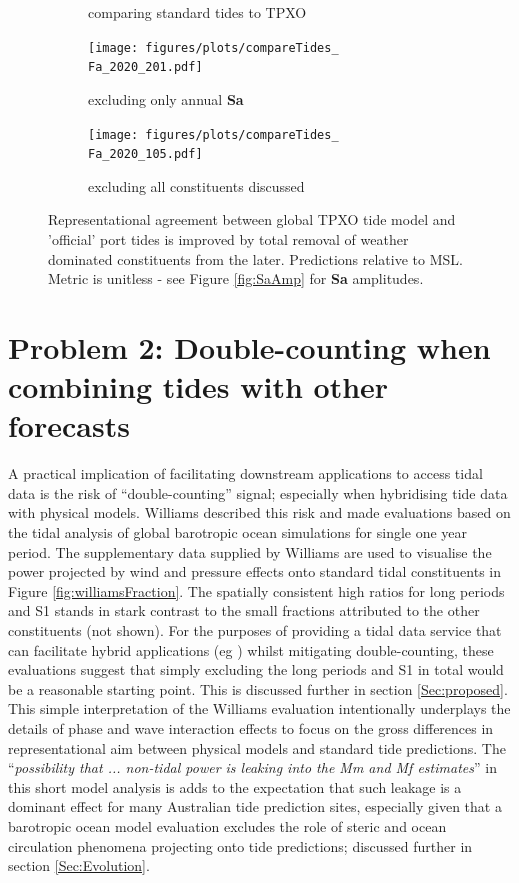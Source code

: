 \begin{figure}[H]
\begin{subfigure}[b]{\figwidthThird}
        \caption{\Fname{} comparing standard tides to TPXO}
    \end{subfigure}
    \begin{subfigure}[b]{\figwidthThird}
        \texttt{[image: figures/plots/compareTides\_\\Fa\_2020\_201.pdf]} 
        \caption{\Fname{} excluding only annual \textbf{Sa}}
    \end{subfigure}
    \begin{subfigure}[b]{\figwidthThird}
        \texttt{[image: figures/plots/compareTides\_\\Fa\_2020\_105.pdf]} 
        \caption{\Fname{} excluding all constituents discussed}
    \end{subfigure}
    
    \caption{Representational agreement between global TPXO tide model and 'official' port tides is improved by total removal of weather dominated constituents from the later.   Predictions relative to MSL.  Metric is unitless - see Figure \ref{fig:SaAmp} for \textbf{Sa} amplitudes.}
    \label{fig:improveOtps}
\end{figure}   


\section{Problem 2: Double-counting when combining tides with other forecasts}
\label{Sec:DoubleCount}
A practical implication of facilitating downstream applications to access tidal data is the risk of ``double-counting'' signal; especially when hybridising tide data with physical models. 
Williams \cite{10.5194/os-2020-107} described this risk and made evaluations based on the tidal analysis of global barotropic ocean simulations for single one year period. 
The supplementary data supplied by Williams are used to visualise the power projected by wind and pressure effects onto standard tidal constituents in Figure \ref{fig:williamsFraction}.  The spatially consistent high ratios for long periods and S1 stands in stark contrast to the small fractions attributed to the other constituents (not shown).    
For the purposes of providing a tidal data service that can facilitate hybrid applications (eg \cite{Taylor:2017coa}) whilst mitigating double-counting, these evaluations suggest that simply excluding the long periods and S1 in total would be a reasonable starting point.   This is discussed further in  section \ref{Sec:proposed}.
This simple interpretation of the Williams evaluation intentionally underplays the details of phase and wave interaction effects to focus on the gross differences in representational aim between physical models and standard tide predictions. 
The ``\textit{possibility that ... non-tidal power is leaking into the Mm and Mf estimates}'' in this short model analysis is adds to the expectation that such leakage is a dominant effect for many Australian tide prediction sites, especially given that a barotropic ocean model evaluation excludes the role of steric and ocean circulation phenomena projecting onto tide predictions; discussed further in section \ref{Sec:Evolution}.

